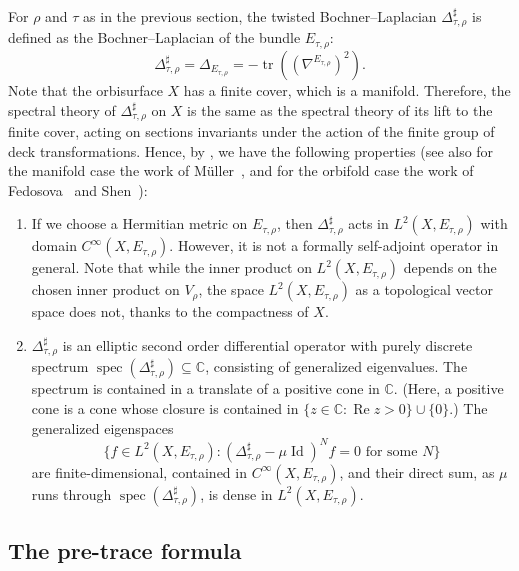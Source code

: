 \documentclass[JEP,XML,SOM,Unicode,NoFloatCountersInSection,published]{cedram}
\theoremstyle{plain}
\theoremstyle{definition}
\theoremstyle{remark}
\newcommand{\C}{\mathbb{C}}
\DeclareMathOperator{\RE}{Re}
\DeclareMathOperator{\tr}{tr}
\DeclareMathOperator{\Id}{Id}
\DeclareMathOperator{\spec}{spec}
\numberwithin{equation}{section}
\begin{document}
For $\rho$ and $\tau$ as in the previous section, the twisted Bochner--Laplacian $\Delta_{\tau,\rho}^\sharp$ is defined as the Bochner--Laplacian of the bundle $E_{\tau,\rho}$:
\[
\Delta_{\tau,\rho}^\sharp = \Delta_{E_{\tau,\rho}} = -\tr\left((\nabla^{E_{\tau,\rho}})^2\right).
\]
Note that the orbisurface $X$ has a finite cover, which is a manifold. Therefore, the spectral theory of $\Delta_{\tau,\rho}^\sharp$ on $X$ is the same as the spectral theory of its lift to the finite cover, acting on sections invariants under the action of the finite group of deck transformations. Hence, by \cite[Th.\,4.3]{Mk}, we have the following properties (see also for the manifold case the work of Müller~\cite{M1}, and for the orbifold case the work of Fedosova~\cite{fedell} and Shen~\cite[\S 7]{Shen2020}):
\begin{enumerate}
\item If we choose a Hermitian metric on $E_{\tau,\rho}$, then $\Delta_{\tau,\rho}^\sharp$ acts in $L^2(X,E_{\tau,\rho})$ with domain $C^\infty(X,E_{\tau,\rho})$. However, it is not a formally self-adjoint operator in general. Note that while the inner product on $L^2(X,E_{\tau,\rho})$ depends on the chosen inner product on $V_\rho$, the space $L^2(X,E_{\tau,\rho})$ as a topological vector space does not, thanks to the compactness of $X$.
\item $\Delta_{\tau,\rho}^\sharp$ is an elliptic second order differential operator with purely discrete spectrum $\spec(\Delta_{\tau,\rho}^\sharp)\subseteq\C$, consisting of generalized eigenvalues. The spectrum is contained in a translate of a positive cone in $\C$. (Here, a positive cone is a cone whose closure is contained in $\{z\in\C:\RE z>0\}\cup\{0\}$.) The generalized eigenspaces
\[
\{f\in L^2(X,E_{\tau,\rho}):(\Delta_{\tau,\rho}^\sharp-\mu\Id)^Nf=0\mbox{ for some }N\}
\]
are finite-dimensional, contained in $C^\infty(X,E_{\tau,\rho})$, and their direct sum, as $\mu$ runs through $\spec(\Delta_{\tau,\rho}^\sharp)$, is dense in $L^2(X,E_{\tau,\rho})$.
\end{enumerate}

\subsection{The pre-trace formula}
\label{subsec:pretrace}
\end{document}
